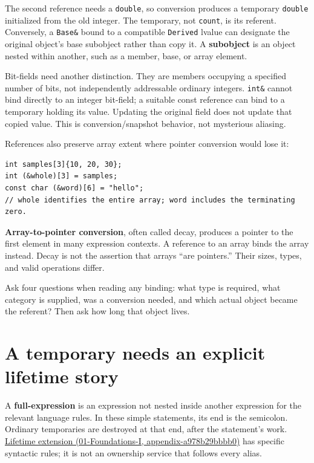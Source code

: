 The second reference needs a \texttt{double}, so conversion produces a temporary \texttt{double} initialized from the old integer. The temporary, not \texttt{count}, is its referent. Conversely, a \texttt{Base\&} bound to a compatible \texttt{Derived} lvalue can designate the original object's base subobject rather than copy it. A \textbf{subobject} is an object nested within another, such as a member, base, or array element.

Bit-fields need another distinction. They are members occupying a specified number of bits, not independently addressable ordinary integers. \texttt{int\&} cannot bind directly to an integer bit-field; a suitable const reference can bind to a temporary holding its value. Updating the original field does not update that copied value. This is conversion/snapshot behavior, not mysterious aliasing.

References also preserve array extent where pointer conversion would lose it:

\begin{verbatim}
int samples[3]{10, 20, 30};
int (&whole)[3] = samples;
const char (&word)[6] = "hello";
// whole identifies the entire array; word includes the terminating zero.
\end{verbatim}

\textbf{Array-to-pointer conversion}, often called decay, produces a pointer to the first element in many expression contexts. A reference to an array binds the array instead. Decay is not the assertion that arrays ``are pointers.'' Their sizes, types, and valid operations differ.

Ask four questions when reading any binding: what type is required, what category is supplied, was a conversion needed, and which actual object became the referent? Then ask how long that object lives.

\section{A temporary needs an explicit lifetime story}\label{05-engine-i-ch003-a-temporary-needs-an-explicit-lifetime-story}

A \textbf{full-expression} is an expression not nested inside another expression for the relevant language rules. In these simple statements, its end is the semicolon. Ordinary temporaries are destroyed at that end, after the statement's work. \href{../01-Foundations-I/main.pdf\#nameddest=appendix-a978b29bbbb0}{Lifetime extension (01-Foundations-I, appendix-a978b29bbbb0)} has specific syntactic rules; it is not an ownership service that follows every alias.

